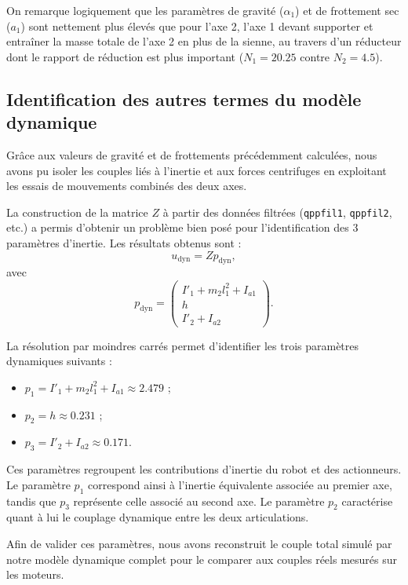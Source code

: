 \documentclass[10pt,a4paper,twocolumn]{article}
\begin{document}
On remarque logiquement que les paramètres de gravité ($\alpha_1$) et de frottement 
sec ($a_1$) sont nettement plus élevés que pour l'axe 2, l'axe 1 devant supporter et 
entraîner la masse totale de l'axe 2 en plus de la sienne, au travers d'un réducteur 
dont le rapport de réduction est plus important ($N_1 = 20.25$ contre $N_2 = 4.5$).

\subsection{Identification des autres termes du modèle dynamique}
Grâce aux valeurs de gravité et de frottements précédemment calculées, 
nous avons pu isoler les couples liés à l'inertie et aux forces centrifuges en 
exploitant les essais de mouvements combinés des deux axes.

La construction de la matrice $Z$ à partir des données filtrées (\texttt{qppfil1}, 
\texttt{qppfil2}, etc.) a permis d'obtenir un problème bien posé pour l'identification 
des 3 paramètres d'inertie.
Les résultats obtenus sont :
\[
u_{\mathrm{dyn}} = Zp_{\mathrm{dyn}},
\]
avec
\[
p_{\mathrm{dyn}} =
\begin{pmatrix}
I'_1+m_2l_1^2+I_{a1}\\
h\\
I'_2+I_{a2}
\end{pmatrix}.
\]

La résolution par moindres carrés permet d'identifier les trois paramètres
dynamiques suivants :
\begin{itemize}
    \item $p_1 = I'_1 + m_2 l_1^2 + I_{a1} \approx 2.479$ ;
    \item $p_2 = h \approx 0.231$ ;
    \item $p_3 = I'_2 + I_{a2} \approx 0.171$.
\end{itemize}

Ces paramètres regroupent les contributions d'inertie du robot et des actionneurs. 
Le paramètre $p_1$ correspond ainsi à l'inertie équivalente associée au premier axe, 
tandis que $p_3$ représente celle associé au second axe. Le paramètre $p_2$ caractérise 
quant à lui le couplage dynamique entre les deux articulations.

Afin de valider ces paramètres, nous avons reconstruit le couple total simulé par notre 
modèle dynamique complet pour le comparer aux couples réels mesurés sur les moteurs. \\
\end{document}

